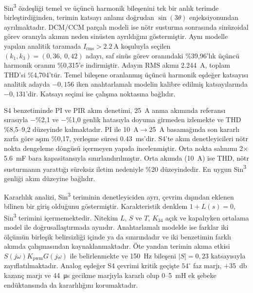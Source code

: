 Sin\textsuperscript{3} özdeşliği temel ve üçüncü harmonik bileşenini tek bir anlık terimde birleştirdiğinden, terimin katsayı anlamı doğrudan $\sin(3\theta)$ enjeksiyonundan ayrılmaktadır. DCM/CCM parçalı modeli ise nötr susturma sonrasında sinüzoidal görev oranıyla akımın neden sinüsten ayrıldığını göstermiştir. Aynı modelle yapılan analitik taramada $I_{\mathrm{rms}}>\SI{2.2}{\ampere}$ koşuluyla seçilen $(k_1,k_3)=(0{,}36,\ 0{,}42)$ adayı, saf sinüs görev oranındaki \%39,96'lık üçüncü harmonik oranını \%0,315'e indirmiştir. Adayın RMS akımı \SI{2.244}{\ampere}, toplam THD'si \%4,704'tür. Temel bileşene oranlanmış üçüncü harmonik eşdeğer katsayısı analitik adayda $-0{,}156$ iken anahtarlamalı modelin kalibre edilmiş katsayılarında $-0{,}131$'dir. Katsayı seçimi ise çalışma noktasına bağlıdır.

S4 benzetiminde PI ve PIR akım denetimi, \SI{25}{\ampere} anma akımında referansı sırasıyla $-$\%2,1 ve $-$\%1,0 genlik hatasıyla doyuma girmeden izlemekte ve THD \%8,5--9,2 düzeyinde kalmaktadır. PI ile \SI{10}{\ampere}$\rightarrow$\SI{25}{\ampere} basamağında son kararlı zarfa göre aşım \%0,17, yerleşme süresi \SI{0.43}{\milli\second}'dir. S4'te akım denetleyicileri nötr nokta dengeleme döngüsü içermeyen yapıda incelenmiştir. Orta nokta salınımı 2$\times$\SI{5.6}{\milli\farad} bara kapasitansıyla sınırlandırılmıştır. Orta akımda (\SI{10}{\ampere}) ise THD, nötr susturmanın yarattığı süreksiz iletim nedeniyle \%20 düzeyindedir. En uygun Sin\textsuperscript{3} genliği akım düzeyine bağlıdır.

Kararlılık analizi, Sin\textsuperscript{3} teriminin denetleyiciden ayrı, çevrim dışından eklenen bilinen bir giriş olduğunu göstermiştir. Karakteristik denklem $1+L(s)=0$, Sin\textsuperscript{3} terimini içermemektedir. Nitekim $L$, $S$ ve $T$, $K_{34}$ açık ve kapalıyken ortalama model ile doğrusallaştırmada aynıdır. Anahtarlamalı modelde ise farklar iki ölçümün birleşik belirsizliği içinde ya da sınırındadır ve iki benzetimin farklı akımda çalışmasından kaynaklanmaktadır. Öte yandan terimin akıma etkisi $S(j\omega)K_{\mathrm{pwm}}G(j\omega)$ ile belirlenmekte ve \SI{150}{\hertz} bileşeni $|S|=0{,}23$ katsayısıyla zayıflatılmaktadır. Analog eşdeğer S4 çevrimi kritik geçişte $54^{\circ}$ faz marjı, $+$\SI{35}{\decibel} kazanç marjı ve \SI{44}{\micro\second} gecikme marjıyla kararlı olup 0--\SI{5}{\milli\henry} ek şebeke endüktansında da kararlılığını korumaktadır.
